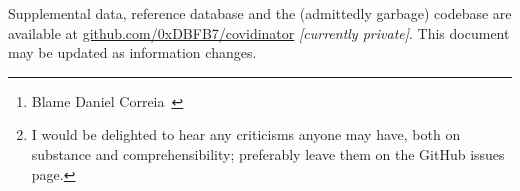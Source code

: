 \documentclass[paper.tex]{subfiles}
\begin{document}
\begin{abstract}
	Given that every route pursued consumes precious resources and attention, in retrospect, this was probably not a good use of time.\\
	
	It is perhaps notable that an entirely free and open-source software toolchain was used for the entire project; all instruments were custom-built and relatively inexpensive; and the results are hopefully replicable by workers without biology equipment for under \$5000.
	
	
	\footnote{Blame \small{{Daniel Correia}\ }}
	
	\footnote{{I would be delighted to hear any criticisms anyone may have, both on substance and comprehensibility; preferably leave them on the GitHub issues page.}}
\end{abstract}

\begin{tcolorbox}
\noindent Supplemental data, reference database and the (admittedly garbage) codebase are available at 
\href{https://www.github.com/0xDBFB7/covidinator}{github.com/0xDBFB7/covidinator} \textit{[currently private]}. This document 
may be updated as information changes.
\end{tcolorbox}
\clearpage

\end{document}
